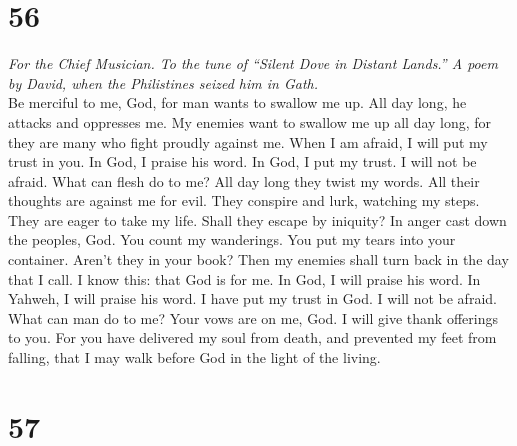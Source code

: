 \hypertarget{section-55}{%
\section{56}\label{section-55}}

\emph{For the Chief Musician. To the tune of ``Silent Dove in Distant
Lands.'' A poem by David, when the Philistines seized him in Gath.}\\
 Be merciful to me, God, for man wants to swallow me up.
All day long, he attacks and oppresses me.  My enemies
want to swallow me up all day long, for they are many who fight proudly
against me.  When I am afraid, I will put my trust in you.
 In God, I praise his word. In God, I put my trust. I will
not be afraid. What can flesh do to me?  All day long they
twist my words. All their thoughts are against me for evil.
 They conspire and lurk, watching my steps. They are eager
to take my life.  Shall they escape by iniquity? In anger
cast down the peoples, God.  You count my wanderings. You
put my tears into your container. Aren't they in your book?
 Then my enemies shall turn back in the day that I call. I
know this: that God is for me.  In God, I will praise his
word. In Yahweh, I will praise his word.  I have put my
trust in God. I will not be afraid. What can man do to me?
 Your vows are on me, God. I will give thank offerings to
you.  For you have delivered my soul from death, and
prevented my feet from falling, that I may walk before God in the light
of the living.

\hypertarget{section-56}{%
\section{57}\label{section-56}}

